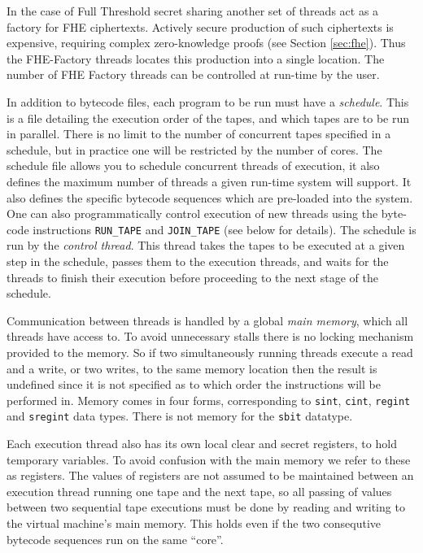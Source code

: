 In the case of Full Threshold secret sharing another set of
threads act as a factory for FHE ciphertexts. Actively secure
production of such ciphertexts is expensive, requiring complex
zero-knowledge proofs (see Section \ref{sec:fhe}). Thus
the FHE-Factory threads locates this production into a
single location. The number of FHE Factory threads can be
controlled at run-time by the user.

In addition to bytecode files, each program to be run must
have a \emph{schedule}. This is a file detailing the execution
order of the tapes, and which tapes are to be run in parallel.
There is no limit to the number of concurrent tapes specified in a schedule, 
but in practice one will be restricted by the number of cores.
The schedule file allows you to schedule concurrent threads
of execution, it also defines the maximum number of threads
a given run-time system will support. It also defines
the specific bytecode sequences which are pre-loaded
into the system.
One can also programmatically control execution of new
threads using the byte-code instructions \verb+RUN_TAPE+ and \verb+JOIN_TAPE+
(see below for details).
The schedule is run by the \emph{control thread}.
This thread takes the tapes to be executed at a
given step in the schedule, passes them to the execution
threads, and waits for the threads to
finish their execution before proceeding to the next stage of
the schedule.

Communication between threads is handled by a global
\emph{main memory}, which all threads have access to.
To avoid unnecessary stalls there is no locking mechanism provided to
the memory. So if two simultaneously running threads
execute a read and a write, or two writes, to the same
memory location then the result is undefined since it is
not specified as to which order the instructions
will be performed in.
Memory comes in four forms, corresponding to
\verb+sint+, \verb+cint+, \verb+regint+ and \verb+sregint+
data types. There is not memory for the \verb+sbit+
datatype.

Each execution thread also has its own local clear and secret
registers, to hold temporary variables.
To avoid confusion with the main memory we refer to these
as registers.
The values of registers are not assumed to be maintained
between an execution thread running one tape and
the next tape, so all passing of values
between two sequential tape executions must be done
by reading and writing to the virtual machine's main memory.
This holds even if the two consequtive bytecode
sequences run  on the same ``core''.

